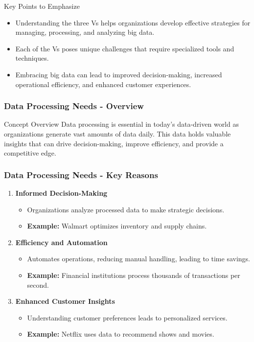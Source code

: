 \documentclass[aspectratio=169]{beamer}
\begin{document}
\begin{frame}[fragile]{Key Points to Emphasize}
    \begin{itemize}
        \item Understanding the three Vs helps organizations develop effective strategies for managing, processing, and analyzing big data.
        \item Each of the Vs poses unique challenges that require specialized tools and techniques.
        \item Embracing big data can lead to improved decision-making, increased operational efficiency, and enhanced customer experiences.
    \end{itemize}
\end{frame}

\begin{frame}[fragile]
    \frametitle{Data Processing Needs - Overview}
    \begin{block}{Concept Overview}
        Data processing is essential in today's data-driven world as organizations generate vast amounts of data daily. 
        This data holds valuable insights that can drive decision-making, improve efficiency, and provide a competitive edge.
    \end{block}
\end{frame}

\begin{frame}[fragile]
    \frametitle{Data Processing Needs - Key Reasons}
    \begin{enumerate}
        \item \textbf{Informed Decision-Making}
        \begin{itemize}
            \item Organizations analyze processed data to make strategic decisions.
            \item \textbf{Example:} Walmart optimizes inventory and supply chains.
        \end{itemize}
        
        \item \textbf{Efficiency and Automation}
        \begin{itemize}
            \item Automates operations, reducing manual handling, leading to time savings.
            \item \textbf{Example:} Financial institutions process thousands of transactions per second.
        \end{itemize}

        \item \textbf{Enhanced Customer Insights}
        \begin{itemize}
            \item Understanding customer preferences leads to personalized services.
            \item \textbf{Example:} Netflix uses data to recommend shows and movies.
        \end{itemize}
    \end{enumerate}
\end{frame}
\end{document}
